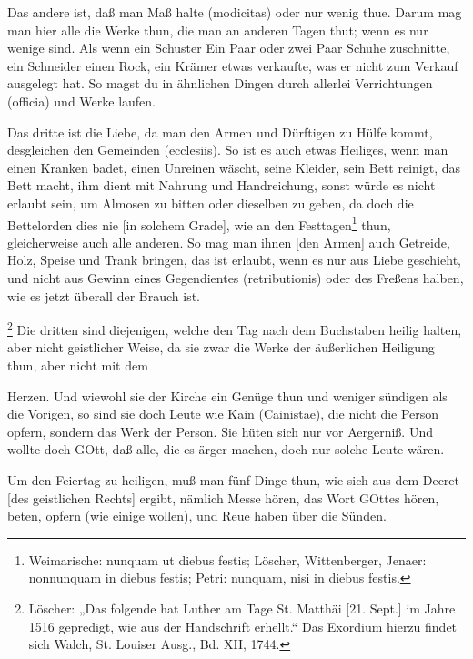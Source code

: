 Das andere ist, daß man Maß halte (modicitas) oder nur wenig thue. Darum mag man hier alle die Werke thun, die man an anderen Tagen thut; wenn es nur wenige sind. Als wenn ein Schuster Ein Paar oder zwei Paar Schuhe zuschnitte, ein Schneider einen Rock, ein Krämer etwas verkaufte, was er nicht zum Verkauf ausgelegt hat. So magst du in ähnlichen Dingen durch allerlei Verrichtungen (officia) und Werke laufen.

Das dritte ist die Liebe, da man den Armen und Dürftigen zu Hülfe kommt, desgleichen den Gemeinden (ecclesiis). So ist es auch etwas Heiliges, wenn man einen Kranken badet, einen Unreinen wäscht, seine Kleider, sein Bett reinigt, das Bett macht, ihm dient mit Nahrung und Handreichung, sonst würde es nicht erlaubt sein, um Almosen zu bitten oder dieselben zu geben, da doch die Bettelorden dies nie [in solchem Grade], wie an den Festtagen\footnote{Weimarische: nunquam ut diebus festis; Löscher, Wittenberger, Jenaer: nonnunquam in diebus festis; Petri: nunquam, nisi in diebus festis.} thun, gleicherweise auch alle anderen. So mag man ihnen [den Armen] auch Getreide, Holz, Speise und Trank bringen, das ist erlaubt, wenn es nur aus Liebe geschieht, und nicht aus Gewinn eines Gegendientes (retributionis) oder des Freßens halben, wie es jetzt überall der Brauch ist.

\footnote{Löscher: „Das folgende hat Luther am Tage St. Matthäi [21. Sept.] im Jahre 1516 gepredigt, wie aus der Handschrift erhellt.“ Das Exordium hierzu findet sich Walch, St. Louiser Ausg., Bd. XII, 1744.} Die dritten sind diejenigen, welche den Tag nach dem Buchstaben heilig halten, aber nicht geistlicher Weise, da sie zwar die Werke der äußerlichen Heiligung thun, aber nicht mit dem

Herzen. Und wiewohl sie der Kirche ein Genüge thun und weniger sündigen als die Vorigen, so sind sie doch Leute wie Kain (Cainistae), die nicht die Person opfern, sondern das Werk der Person. Sie hüten sich nur vor Aergerniß. Und wollte doch GOtt, daß alle, die es ärger machen, doch nur solche Leute wären.

Um den Feiertag zu heiligen, muß man fünf Dinge thun, wie sich aus dem Decret [des geistlichen Rechts] ergibt, nämlich Messe hören, das Wort GOttes hören, beten, opfern (wie einige wollen), und Reue haben über die Sünden.

